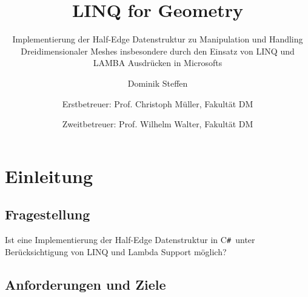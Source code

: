 \documentclass[pagesize, paper=a4, fontsize=12pt,titlepage=true, headings=small, headnosepline, abstractoff, liststotoc, nochapterprefix, plainheadsepline]{scrreprt}
\author{
Dominik Steffen \and
Erstbetreuer: Prof. Christoph Müller, Fakultät DM \and
Zweitbetreuer: Prof. Wilhelm Walter, Fakultät DM
}
\title{LINQ for Geometry}
\subtitle{Implementierung der Half-Edge Datenstruktur zu Manipulation und Handling Dreidimensionaler Meshes insbesondere durch den Einsatz von LINQ und LAMBA Ausdrücken in Microsofts \CS}
\newcommand{\CSS}{C\texttt{\# }}
\newcommand{\LQ}{ LINQ }
\begin{document}
\maketitle

\begingroup
	\clearpage
	\pagestyle{empty}
	\renewcommand*{\chapterpagestyle}{empty}
	\tableofcontents
	\clearpage
\endgroup

\pagestyle{plain}
\setcounter{page}{1}









\chapter {Einleitung}
	\section {Fragestellung}
Ist eine Implementierung der Half-Edge Datenstruktur in \CSS unter Berücksichtigung von\LQ und Lambda Support möglich?
	\section {Anforderungen und Ziele}
	
\end{document}
